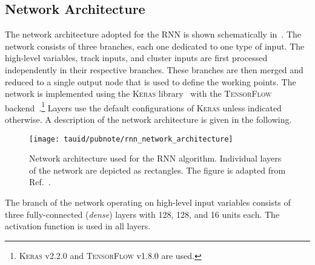 \subsection{Network Architecture}

The network architecture adopted for the RNN \tauid is shown
schematically in~. The network
consists of three branches, each one dedicated to one type of
input. The high-level variables, track inputs, and cluster inputs are
first processed independently in their respective branches. These
branches are then merged and reduced to a single output node that is
used to define the \tauid working points. The network is implemented
using the \textsc{Keras} library~\cite{keras} with the
\textsc{TensorFlow}
backend~\cite{tensorflow2015-whitepaper}.\footnote{\textsc{Keras}
  v2.2.0 and \textsc{TensorFlow} v1.8.0 are used.} Layers use the
default configurations of \textsc{Keras} unless indicated otherwise. A
description of the network architecture is given in the following.

\begin{figure}[htbp]
  \centering

  \vspace*{0.2em}

  \texttt{[image: tauid/pubnote/rnn\_network\_architecture]}

  \vspace*{0.2em}

  \caption[Network architecture used for the RNN \tauid algorithm.]{Network
    architecture used for the RNN \tauid algorithm. Individual layers of the
    network are depicted as rectangles. The figure is adapted from
    Ref.~\cite{ATL-PHYS-PUB-2019-033}.}%
  \label{fig:tauid_network_architecture}
\end{figure}

The branch of the network operating on high-level input variables
consists of three fully-connected (\emph{dense}) layers with 128, 128,
and 16 units each. The \ReLU~\cite{nair:relu} activation function is
used in all layers.

